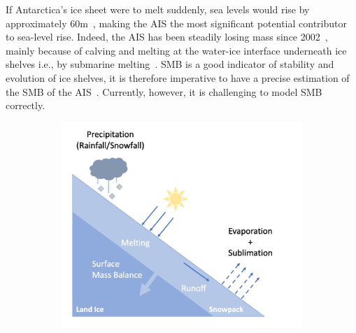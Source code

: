 \documentclass[a4paper,11pt,oneside]{report}
\begin{document}
\begin{itemize}
\begin{itemize}
        If Antarctica's ice sheet were to melt suddenly, sea levels would rise by approximately $60$\si{m}~\cite{Kittel, Fretwell, Morlighem}, making the AIS the most significant potential contributor to sea-level rise. Indeed, the AIS has been steadily losing mass since 2002~\cite{Shepherd, Mottram}, mainly because of calving and melting at the water-ice interface underneath ice shelves i.e., by submarine melting~\cite{Kittel, Mottram, Rignot}. SMB is a good indicator of stability and evolution of ice shelves, it is therefore imperative to have a precise estimation of the SMB of the AIS~\cite{icesheet}. Currently, however, it is challenging to model SMB correctly.  
    \end{itemize}
    
    \begin{figure}[tbp]
        \centering
        \begin{subfigure}[b]{0.45\columnwidth}  
            \centering 
            \includegraphics[width=\textwidth]{doc/Thesis-latex/images/processes_smb.pdf}
            \caption[]%
            {{\small }} \label{fig:smb-processes}
        \end{subfigure}
        \hfill
        \begin{subfigure}[b]{0.45\columnwidth}

\end{subfigure}
\end{figure}
\end{itemize}
\end{document}
